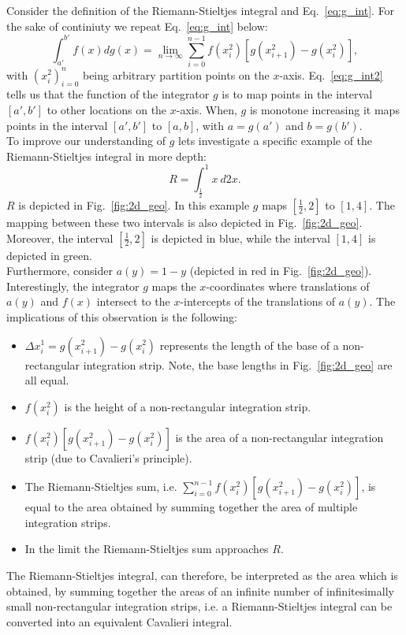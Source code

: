 \documentclass{article}
\theoremstyle{theorem}
\theoremstyle{definition}
\begin{document}
Consider the definition of the Riemann-Stieltjes integral and 
Eq.~\eqref{eq:g_int}. For the sake of continiuty we repeat Eq.~\eqref{eq:g_int} below:
\begin{equation}
\label{eq:g_int2}
\int_{a'}^{b'} f(x) dg(x) =  \lim_{n \rightarrow \infty}\sum_{i=0}^{n-1} f(x_i^2)[g(x_{i+1}^2)-g(x_{i}^2)], 
\end{equation}
with $(x_i^2)_{i=0}^n$ being arbitrary partition points on the $x$-axis.
Eq.~\eqref{eq:g_int2} tells us that the function of the integrator $g$ is to map points in the interval $[a',b']$ to other 
locations on the $x$-axis. When, $g$ is monotone increasing it maps points in the interval $[a',b']$ to $[a,b]$,
with $a = g(a')$ and $b = g(b')$.\\

\noindent
To improve our understanding of $g$ lets investigate a specific example of the Riemann-Stieltjes integral in more depth: 
\begin{equation}
R = \int_{\frac{1}{2}}^1 x~d2x. 
\end{equation}
$R$ is depicted in Fig.~\ref{fig:2d_geo}. In this example $g$ maps $[\frac{1}{2},2]$ to $[1,4]$. The mapping between these two intervals is also 
depicted in Fig.~\ref{fig:2d_geo}. Moreover, the interval $[\frac{1}{2},2]$ is depicted in blue,
while the interval $[1,4]$ is depicted in green.\\ 

\noindent
Furthermore, consider $a(y) = 1-y$ (depicted in red in Fig.~\ref{fig:2d_geo}). Interestingly, the integrator $g$ maps the $x$-coordinates where translations of $a(y)$ and $f(x)$ intersect to the $x$-intercepts of the translations of $a(y)$.
The implications of this observation is the following: 
\begin{itemize}
 \item $\Delta x_i^1 = g(x_{i+1}^2)-g(x_{i}^2)$ represents the length of the base of a non-rectangular integration strip. Note, the base lengths in Fig.~\ref{fig:2d_geo} are all equal.
 \item $f(x_i^2)$ is the height of a non-rectangular integration strip.
 \item $f(x_i^2)[g(x_{i+1}^2)-g(x_{i}^2)]$ is the area of a non-rectangular integration strip (due to Cavalieri's principle).
 \item The Riemann-Stieltjes sum, i.e. $\sum_{i=0}^{n-1} f(x_i^2)[g(x_{i+1}^2)-g(x_{i}^2)]$, is equal to the area obtained by summing together the area of multiple 
 integration strips.
 \item In the limit the Riemann-Stieltjes sum approaches $R$. 
\end{itemize}
The Riemann-Stieltjes integral, can therefore, be interpreted as the area which is obtained, by summing together the areas of an infinite number of infinitesimally small non-rectangular integration strips,
i.e. a Riemann-Stieltjes integral can be converted into an equivalent Cavalieri integral.\\
\end{document}
